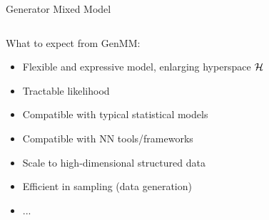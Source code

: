 \begin{frame}{Generator Mixed Model}
\begin{columns}
\begin{minipage}{\linewidth}
    \end{minipage}
  \end{columns}
  
  \vskip -0.5cm
  What to expect from GenMM:
  \begin{itemize}[label=\textbullet]
  \item {Flexible and expressive model, enlarging hyperspace $\mathcal{H}$}
  \item {Tractable likelihood} 
  \item {Compatible with typical statistical models}
  \item Compatible with NN tools/frameworks
  \item {Scale to high-dimensional structured data}
  \item {Efficient in sampling (data generation)}
  \item {...}
  \end{itemize}

\end{frame}





